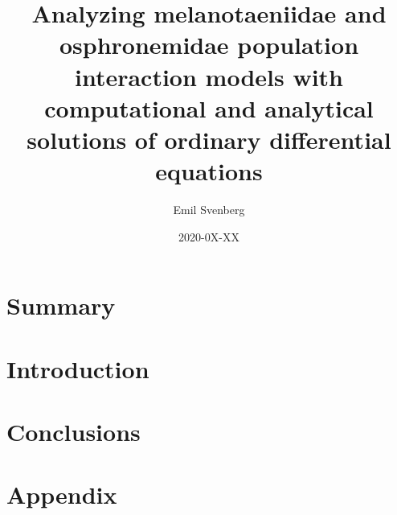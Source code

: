 \documentclass{article}
\title{Analyzing melanotaeniidae and osphronemidae population interaction models with computational 
and analytical solutions of ordinary differential equations}
\author{Emil Svenberg}
\date{2020-0X-XX}
\begin{document}
\maketitle

\section{Summary}

\section{Introduction}



\section{Conclusions}

\section{Appendix}
\end{document}
